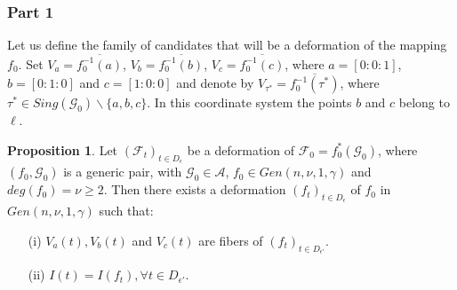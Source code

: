 \documentclass{amsart}
\theoremstyle{definition}
\theoremstyle{proposition}
\newtheorem{proposition}[theorem]{Proposition}
\numberwithin{equation}{section}
\theoremstyle{main}
\begin{document}
\subsubsection{Part 1}\label{part1} Let us define the family of candidates that will be a deformation of the mapping $f_{0}.$   Set $V_{a}=\overline{{f}_{0}^{-1}(a)}$, $V_{b}=\overline{{f}_{0}^{-1}(b)}$, $V_{c}=\overline{{f}_{0}^{-1}(c)}$, where $a=[0:0:1]$, $b=[0:1:0]$ and  $c=[1:0:0]$ and denote by $V_{\tau^\ast}=\overline{{f}_{0}^{-1}(\tau^\ast)}$, where $\tau^\ast \in Sing(\mathcal G_{0})\backslash\{a,b,c\}$. In this coordinate system the points $b$ and $c$ belong to $\ell$.
  \begin{proposition}\label{recupmapas}
Let $(\mathcal{F}_{t})_{t \in D_{\epsilon}}$ be a deformation of $\mathcal F_{0}= f_{0}^*(\mathcal G_{0})$, where $(f_{0}, \mathcal G_{0})$ is a generic pair, with $\mathcal G_{0} \in \mathcal A$, $f_0 \in Gen\left(n,\nu,1,\gamma\right)$ and $deg(f_{0})=\nu\geq 2$. Then there exists a deformation $({f}_{t})_{t \in D_{\epsilon}}$ of $f_{0}$ in $Gen\left(n,\nu,1,\gamma\right)$ such that:
\begin{enumerate}
\item[(i)]$V_{a}(t),V_{b}(t)$ and $V_{c}(t)$ are fibers of $({f}_{t})_{t \in D_{\epsilon'}}$.
\item[(ii)] $I(t)=I(f_{t}), \forall {t \in D_{\epsilon'}}$.
    \end{enumerate}
  \end{proposition}  
\end{document}
